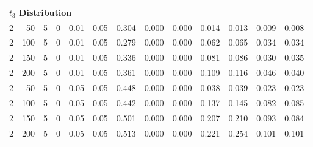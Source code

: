 \begin{table}
{{\begin{tabular}{rrrrrrlllllll}
\multicolumn{13}{l}{\textbf{$t_3$ Distribution}}\\
\hspace{1em}2 & 50 & 5 & 0 & 0.01 & 0.05 & 0.304 & 0.000 & 0.000 & 0.014 & 0.013 & 0.009 & 0.008\\
\hspace{1em}2 & 100 & 5 & 0 & 0.01 & 0.05 & 0.279 & 0.000 & 0.000 & 0.062 & 0.065 & 0.034 & 0.034\\
\hspace{1em}2 & 150 & 5 & 0 & 0.01 & 0.05 & 0.336 & 0.000 & 0.000 & 0.081 & 0.086 & 0.030 & 0.035\\
\hspace{1em}2 & 200 & 5 & 0 & 0.01 & 0.05 & 0.361 & 0.000 & 0.000 & 0.109 & 0.116 & 0.046 & 0.040\\
\hspace{1em}2 & 50 & 5 & 0 & 0.05 & 0.05 & 0.448 & 0.000 & 0.000 & 0.038 & 0.039 & 0.023 & 0.023\\
\hspace{1em}2 & 100 & 5 & 0 & 0.05 & 0.05 & 0.442 & 0.000 & 0.000 & 0.137 & 0.145 & 0.082 & 0.085\\
\hspace{1em}2 & 150 & 5 & 0 & 0.05 & 0.05 & 0.501 & 0.000 & 0.000 & 0.207 & 0.210 & 0.093 & 0.084\\
\hspace{1em}2 & 200 & 5 & 0 & 0.05 & 0.05 & 0.513 & 0.000 & 0.000 & 0.221 & 0.254 & 0.101 & 0.101\\
\bottomrule
\end{tabular}
}}
 \end{table}
